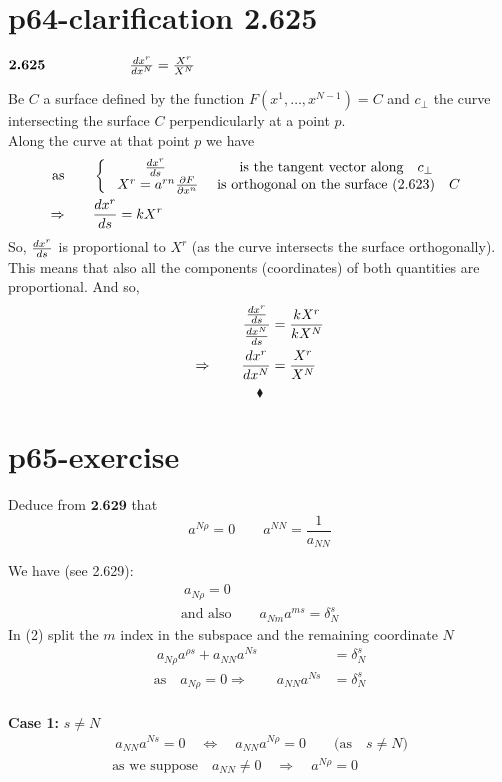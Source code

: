 \section{p64-clarification 2.625}
\begin{tcolorbox}
$\textbf{2.625} \quad\quad\quad\quad\quad\quad \dv{ x^r}{x^N} = \frac{X^r}{X^N}$
\end{tcolorbox}
Be $C$ a surface defined by the function $F(x^1,\dots, x^{N-1}) = C$ and  $c_{\perp}$ the curve intersecting the surface $C$ perpendicularly at a point $p$.\\
Along the curve at that point $p$ we have
\begin{align*}
\text{as}\quad\quad & \left \{ \begin{array}{cc}
\dv{ x^r}{s}& \text{is the tangent vector along}\quad c_{\perp}\\
\ X^r = a^{rn}\pdv{F}{x^n}& \text{ is orthogonal on the surface (2.623)}\quad C\\
\end{array}\right.\\
\Rightarrow \quad\quad & \dv{ x^r}{s} = kX^r
\end{align*}
So, $\dv{ x^r}{s}$ is proportional to $X^r$ (as the curve intersects the surface orthogonally). This means that also all the components (coordinates) of both quantities are proportional. And so,
\begin{align*}
\frac{\dv{ x^r}{s}}{\dv{ x^N}{s}} &= \frac{kX^r}{kX^N}\\
\Rightarrow\quad\quad \dv{ x^r}{x^N} &= \frac{X^r}{X^N}
\end{align*}
$$\blacklozenge$$
\newpage

\section{p65-exercise}
\begin{tcolorbox}
Deduce from $\textbf{2.629}$ that $$a^{N \rho} = 0  \quad\quad a^{NN} = \frac{1}{a_{NN}}$$
\end{tcolorbox}
We have (see 2.629):
\begin{align}
\ a_{N\rho} =0\\
\text{and also}\quad\quad a_{Nm}a^{ms} = \delta^s_N
\end{align}
In (2) split the $m$ index in the subspace and the remaining coordinate $N$
\begin{align*}
\ a_{N\rho}a^{\rho s} +  a_{NN}a^{N s} &= \delta^s_N\\
\text{as}\quad a_{N\rho} =0 \Rightarrow \quad\quad a_{NN}a^{N s} &= \delta^s_N
\end{align*}\\
\textbf{Case 1:} $s\ne N$
\begin{align*}
\  a_{NN}a^{N s} =0 \quad \Leftrightarrow \quad a_{NN}a^{N \rho} =0 \quad\quad \text{(as}\quad s\ne N \text{)}\\
\text{as we suppose}\quad a_{NN}\ne 0 \quad \Rightarrow \quad a^{N \rho} =0
\end{align*}\\

